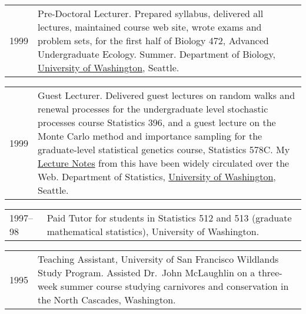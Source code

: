 \documentclass[11pt]{article}
\newlength{\myindent}
\newlength{\postskip}
\newlength{\scndcol}
\begin{document}
\begin{tabular}{ @{}p{2.5\myindent} p{\scndcol}@{}  }
\hspace*{\myindent}1999 &  Pre-Doctoral Lecturer. Prepared syllabus, delivered all lectures,
maintained course web site, wrote exams and problem sets,
for the first half of Biology 472, Advanced Undergraduate Ecology.  Summer.  
Department of Biology, \href{http://www.washington.edu/}{University of Washington}, Seattle.
\end{tabular}

\begin{tabular}{ @{}p{2.5\myindent} p{\scndcol}@{}  }

\hspace*{\myindent}1999 & Guest Lecturer. Delivered guest lectures on random walks and renewal
processes for the undergraduate level stochastic processes course Statistics 396, and a guest lecture
on the Monte Carlo method and importance sampling for the graduate-level statistical genetics course,
Statistics 578C.  My \href{http://ib.berkeley.edu/labs/slatkin/eriq/classes/guest_lect/mc_lecture_notes.pdf}{Lecture Notes} from this have been widely circulated over the Web.   Department of Statistics, \href{http://www.washington.edu/}{University of Washington}, Seattle.
\end{tabular}

\begin{tabular}{ @{}p{2.5\myindent} p{\scndcol}@{}  }
\hspace*{\myindent}1997--98 &  Paid Tutor for students in Statistics 512 and 513 (graduate mathematical
statistics), University of Washington.
\end{tabular}

\begin{tabular}{ @{}p{2.5\myindent} p{\scndcol}@{}  }
\hspace*{\myindent}1995 & Teaching Assistant, University of San Francisco Wildlands Study
Program. Assisted Dr.~John McLaughlin on a three-week summer course studying carnivores and conservation
in  the North Cascades, Washington. \\
\end{tabular}
\vspace*{\postskip}
\end{document}
